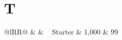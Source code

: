 \documentclass{closettwin}
\begin{document}
\mainmatter
\chapter{T}
\begin{table}[tbp]
\caption{Pricing}
\begin{tabularx}{\textwidth}{@{}lRR@{}}
\toprule
\ctheaderrow{} &  & \
\midrule
Starter & 1,000 & 99\
\bottomrule
\end{tabularx}
\end{table}
\end{document}
